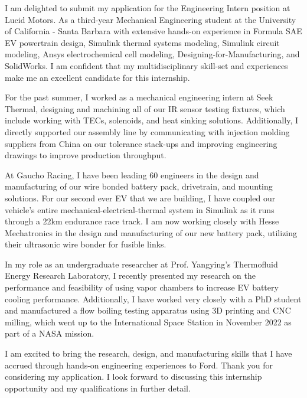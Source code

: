 \documentclass[11pt, letterpaper]{awesome-cv} %
\begin{document}
\makecvheader %

\makelettertitle %


\begin{cvletter}


I am delighted to submit my application for the Engineering Intern position at Lucid Motors. As a third-year Mechanical Engineering student at the University of California - Santa Barbara with extensive hands-on experience in Formula SAE EV powertrain design, Simulink thermal systems modeling, Simulink circuit modeling, Ansys electrochemical cell modeling, Designing-for-Manufacturing, and  SolidWorks. I am confident that my multidisciplinary skill-set and experiences make me an excellent candidate for this internship.

For the past summer, I worked as a mechanical engineering intern at Seek Thermal, designing and machining all of our IR sensor testing fixtures, which include working with TECs, solenoids, and heat sinking solutions. Additionally, I directly supported our assembly line by communicating with injection molding suppliers from China on our tolerance stack-ups and improving engineering drawings to improve production throughput. 

At Gaucho Racing, I have been leading 60 engineers in the design and manufacturing of our wire bonded battery pack, drivetrain, and mounting solutions. For our second ever EV that we are building, I have coupled our vehicle's entire mechanical-electrical-thermal system in Simulink as it runs through a 22km endurance race track. I am now working closely with Hesse Mechatronics in the design and manufacturing of our new battery pack, utilizing their ultrasonic wire bonder for fusible links. 

In my role as an undergraduate researcher at Prof. Yangying's Thermofluid Energy Research Laboratory, I recently presented my research on the performance and feasibility of using vapor chambers to increase EV battery cooling performance. Additionally, I have worked very closely with a PhD student and manufactured a flow boiling testing apparatus using 3D printing and CNC milling, which went up to the International Space Station in November 2022 as part of a NASA mission. 

I am excited to bring the research, design, and manufacturing skills that I have accrued through hands-on engineering experiences to Ford. Thank you for considering my application. I look forward to discussing this internship opportunity and my qualifications in further detail.


\end{cvletter}


\makeletterclosing %
\end{document}
